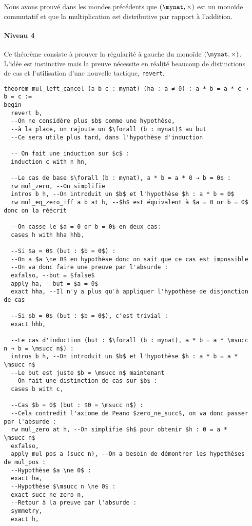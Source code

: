 Nous avons prouvé dans les mondes précédents que $(\mynat , \times )$ est un monoïde commutatif et que la multiplication est distributive par rapport à l'addition.

\paragraph{Niveau 4}

Ce théorème consiste à prouver la régularité à gauche du monoïde $(\mynat, \times)$.
L'idée est instinctive mais la preuve nécessite en réalité beaucoup de distinctions de cas et l'utilisation d'une nouvelle tactique, \texttt{revert}.
\begin{verbatim}
theorem mul_left_cancel (a b c : mynat) (ha : a ≠ 0) : a * b = a * c → b = c :=
begin
  revert b,
  --On ne considère plus $b$ comme une hypothèse,
  --à la place, on rajoute un $\forall (b : mynat)$ au but
  --Ce sera utile plus tard, dans l'hypothèse d'induction
  
  -- On fait une induction sur $c$ :
  induction c with n hn,

  --Le cas de base $\forall (b : mynat), a * b = a * 0 → b = 0$ :
  rw mul_zero, --On simplifie
  intros b h, --On introduit un $b$ et l'hypothèse $h : a * b = 0$
  rw mul_eq_zero_iff a b at h, --$h$ est équivalent à $a = 0 or b = 0$ donc on la réécrit
  
  --On casse le $a = 0 or b = 0$ en deux cas:
  cases h with hha hhb,
  
  --Si $a = 0$ (but : $b = 0$) :
  --On a $a \ne 0$ en hypothèse donc on sait que ce cas est impossible
  --On va donc faire une preuve par l'absurde :
  exfalso, --but = $false$
  apply ha, --but = $a = 0$
  exact hha, --Il n'y a plus qu'à appliquer l'hypothèse de disjonction de cas
  
  --Si $b = 0$ (but : $b = 0$), c'est trivial :
  exact hhb,

  --Le cas d'induction (but : $\forall (b : mynat), a * b = a * \msucc n → b = \msucc n$) :
  intros b h, --On introduit un $b$ et l'hypothèse $h : a * b = a * \msucc n$
  --Le but est juste $b = \msucc n$ maintenant
  --On fait une distinction de cas sur $b$ :
  cases b with c,

  --Cas $b = 0$ (but : $0 = \msucc n$) :
  --Cela contredit l'axiome de Peano $zero_ne_succ$, on va donc passer par l'absurde :
  rw mul_zero at h, --On simplifie $h$ pour obtenir $h : 0 = a * \msucc n$
  exfalso,
  apply mul_pos a (succ n), --On a besoin de démontrer les hypothèses de mul_pos :
  --Hypothèse $a \ne 0$ :
  exact ha,
  --Hypothèse $\msucc n \ne 0$ :
  exact succ_ne_zero n,
  --Retour à la preuve par l'absurde :
  symmetry,
  exact h,


\end{verbatim}
